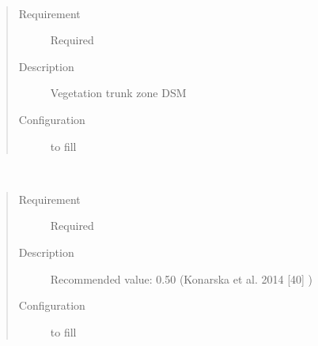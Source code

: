 \documentclass[letterpaper,10pt,english]{sphinxmanual}
\begin{document}

\begin{fulllineitems}
\label{\detokenize{input_files/SOLWEIG_input/SOLWEIGinput:cmdoption-arg-tdsmname}}~\begin{quote}\begin{description}
\item[{Requirement}] \leavevmode
Required

\item[{Description}] \leavevmode
Vegetation trunk zone DSM

\item[{Configuration}] \leavevmode
to fill

\end{description}\end{quote}

\end{fulllineitems}


\begin{fulllineitems}
\label{\detokenize{input_files/SOLWEIG_input/SOLWEIGinput:cmdoption-arg-transmax}}~\begin{quote}\begin{description}
\item[{Requirement}] \leavevmode
Required

\item[{Description}] \leavevmode
Recommended value: 0.50 (Konarska et al. 2014 {[}40{]} )

\item[{Configuration}] \leavevmode
to fill

\end{description}\end{quote}

\end{fulllineitems}

\end{document}
